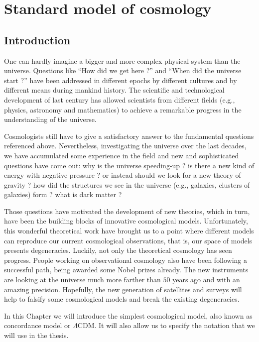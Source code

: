 \chapter{Standard model of cosmology}
\label{chapter:1} 

\section{Introduction}
\label{section:1.1}

One can hardly imagine a bigger and more complex  physical system than the universe. Questions like ``How did we get here ?'' and  ``When did the universe start ?'' have been addressed in different epochs by different cultures and by different means during mankind history. The scientific and technological development of last century has allowed scientists from different fields (e.g., physics, astronomy and mathematics) to achieve a remarkable progress in the understanding of the universe. 

Cosmologists still have to give a satisfactory answer to the fundamental questions referenced above. Nevertheless, investigating the universe over the last decades, we have accumulated some experience in the field and new and  sophisticated questions have come out: why is the universe speeding-up ? is there a new kind of energy with negative pressure ? or instead should we look for a new theory of gravity ? how did the structures we see in the universe (e.g., galaxies, clusters of galaxies) form ? what is dark matter ? 

Those questions have motivated the development of new theories, which in turn, have been the building blocks of innovative cosmological models. Unfortunately, this wonderful theoretical work have brought us to a point where different models can reproduce our current cosmological observations, that is, our space of models presents degeneracies. Luckily, not only the theoretical cosmology has seen progress. People working on observational cosmology also have been following a successful path, being awarded some Nobel prizes already.  The new instruments are looking at the universe much more farther than $50$ years ago and with an amazing precision. Hopefully, the new generation of satellites and surveys will help to falsify some cosmological models and break the existing degeneracies.

In this Chapter we will introduce the simplest cosmological model, also known as concordance model or $\Lambda$CDM.  It will also allow us to specify the notation that we will use in the thesis. 

